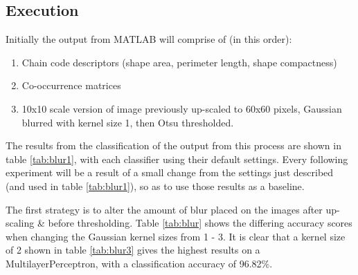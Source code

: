 \documentclass[12pt]{article}
\begin{document}
  \subsection{Execution}
    Initially the output from MATLAB will comprise of (in this order):
    \begin{enumerate}
      \item Chain code descriptors (shape area, perimeter length, shape compactness)
      \item Co-occurrence matrices
      \item 10x10 scale version of image previously up-scaled to 60x60 pixels, Gaussian blurred with kernel size 1, then Otsu thresholded.
    \end{enumerate}
    The results from the classification of the output from this process are shown in table \ref{tab:blur1}, with each classifier using their default settings. Every following experiment will be a result of a small change from the settings just described (and used in table \ref{tab:blur1}), so as to use those results as a baseline.

    \newpage
    The first strategy is to alter the amount of blur placed on the images after up-scaling \& before thresholding. Table \ref{tab:blur} shows the differing accuracy scores when changing the Gaussian kernel sizes from 1 - 3. It is clear that a kernel size of 2 shown in table \ref{tab:blur3} gives the highest results on a MultilayerPerceptron, with a classification accuracy of 96.82\%.
\end{document}
